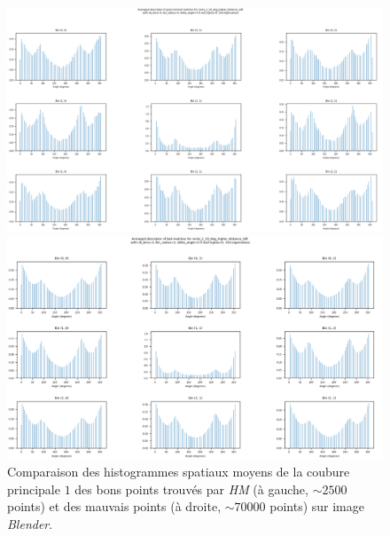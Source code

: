 \documentclass[
	a4paper, %
	10pt, %
	unnumberedsections, %
	twoside, %
]{LTJournalArticle}
\begin{document}
\begin{figure}
	\centering
	\begin{minipage}{\textwidth}
		\centering
		\includegraphics[width=\textwidth]{images/avg_gd_min_desc_10_left_1eig}
	\end{minipage}
	\begin{minipage}{\textwidth}
		\centering
		\includegraphics[width=\textwidth]{images/avg_bad_desc_10_left_1eig.png}
	\end{minipage}
	\caption{Comparaison des histogrammes spatiaux moyens de la coubure principale $1$ des bons points trouvés par \textit{HM} (à gauche, $\sim 2500$ points) et
		des mauvais points (à droite, $\sim 70000$ points) sur image \textit{Blender}.}
	\label{figure:desc_comp}
\end{figure}

\clearpage
\end{document}
